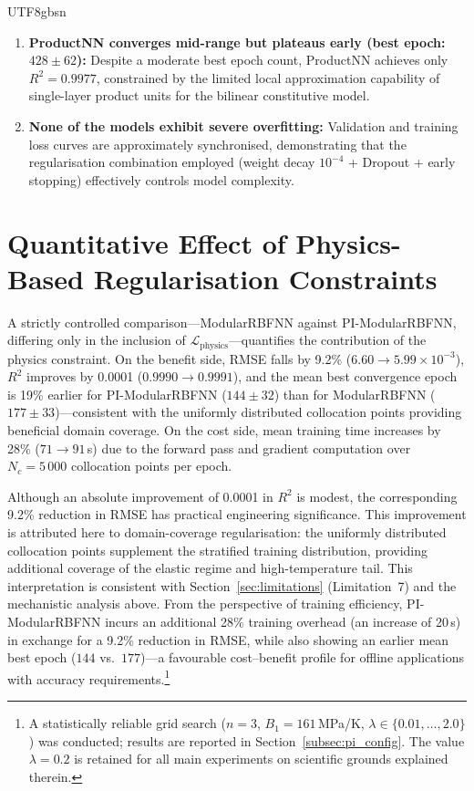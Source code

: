 \documentclass[a4paper,12pt]{report}
\newcommand{\Lphys}{\mathcal{L}_{\text{physics}}}
\begin{document}
\begin{CJK}{UTF8}{gbsn}
\begin{enumerate}
  \item \textbf{ProductNN converges mid-range but plateaus early (best epoch:
    $428 \pm 62$):} Despite a moderate best epoch count, ProductNN achieves only
    $R^2 = 0.9977$, constrained by the limited local approximation capability of
    single-layer product units for the bilinear constitutive model.
  \item \textbf{None of the models exhibit severe overfitting:} Validation and training
    loss curves are approximately synchronised, demonstrating that the regularisation
    combination employed (weight decay $10^{-4}$ + Dropout + early stopping) effectively
    controls model complexity.
\end{enumerate}

\section{Quantitative Effect of Physics-Based Regularisation Constraints}
\label{sec:physics_effect}

A strictly controlled comparison---ModularRBFNN against PI-ModularRBFNN, differing
only in the inclusion of $\Lphys$---quantifies the contribution of the physics
constraint. On the benefit side, RMSE falls by 9.2\%
($6.60 \to 5.99 \times 10^{-3}$), $R^2$ improves by 0.0001 ($0.9990 \to 0.9991$),
and the mean best convergence epoch is 19\% earlier for PI-ModularRBFNN ($144 \pm 32$)
than for ModularRBFNN ($177 \pm 33$)---consistent with the uniformly distributed
collocation points providing beneficial domain coverage. On the cost side, mean training
time increases by 28\% ($71 \to 91$\,s) due to the forward pass and gradient
computation over $N_c = 5\,000$ collocation points per epoch.

Although an absolute improvement of 0.0001 in $R^2$ is modest, the corresponding 9.2\%
reduction in RMSE has practical engineering significance. This improvement is attributed
here to domain-coverage regularisation: the uniformly distributed collocation points
supplement the stratified training distribution, providing additional coverage of the
elastic regime and high-temperature tail. This interpretation is consistent with
Section~\ref{sec:limitations} (Limitation~7) and the mechanistic analysis above.
From the perspective of training efficiency, PI-ModularRBFNN incurs an additional 28\%
training overhead (an increase of 20\,s) in exchange for a 9.2\% reduction in RMSE,
while also showing an earlier mean best epoch ($144$ vs.\ $177$)---a favourable
cost--benefit profile for offline applications with accuracy requirements.\footnote{A
statistically reliable grid search ($n=3$, $B_1=161$\,MPa/K, $\lambda \in
\{0.01,\ldots,2.0\}$) was conducted; results are reported in
Section~\ref{subsec:pi_config}. The value $\lambda=0.2$ is retained for all main
experiments on scientific grounds explained therein.}


\end{CJK}
\end{document}
